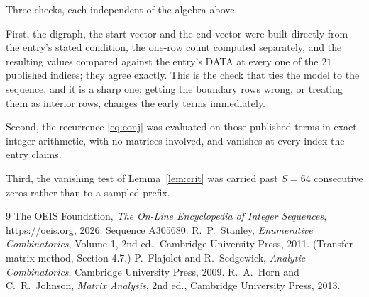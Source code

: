\documentclass[11pt,a4paper]{article}
\theoremstyle{plain}
\theoremstyle{definition}
\begin{document}
Three checks, each independent of the algebra above.

First, the digraph, the start vector and the end vector were built directly from the
entry's stated condition, the one-row count computed separately, and the resulting values
compared against the entry's DATA at every one of the $21$ published indices; they
agree exactly. This is the check that ties the model to the sequence, and it is a sharp one:
getting the boundary rows wrong, or treating them as interior rows, changes the early terms
immediately.

Second, the recurrence \eqref{eq:conj} was evaluated on those published terms in exact
integer arithmetic, with no matrices involved, and vanishes at every index the entry claims.

Third, the vanishing test of Lemma~\ref{lem:crit} was carried past $S=64$ consecutive
zeros rather than to a sampled prefix.

\begin{thebibliography}{9}
 The OEIS Foundation, \emph{The On-Line Encyclopedia of Integer
Sequences}, \url{https://oeis.org}, 2026. Sequence A305680.
 R.~P.~Stanley, \emph{Enumerative Combinatorics}, Volume 1, 2nd ed.,
Cambridge University Press, 2011. (Transfer-matrix method, Section 4.7.)
 P.~Flajolet and R.~Sedgewick, \emph{Analytic Combinatorics}, Cambridge
University Press, 2009.
 R.~A.~Horn and C.~R.~Johnson, \emph{Matrix Analysis}, 2nd ed., Cambridge
University Press, 2013.
\end{thebibliography}
\end{document}
